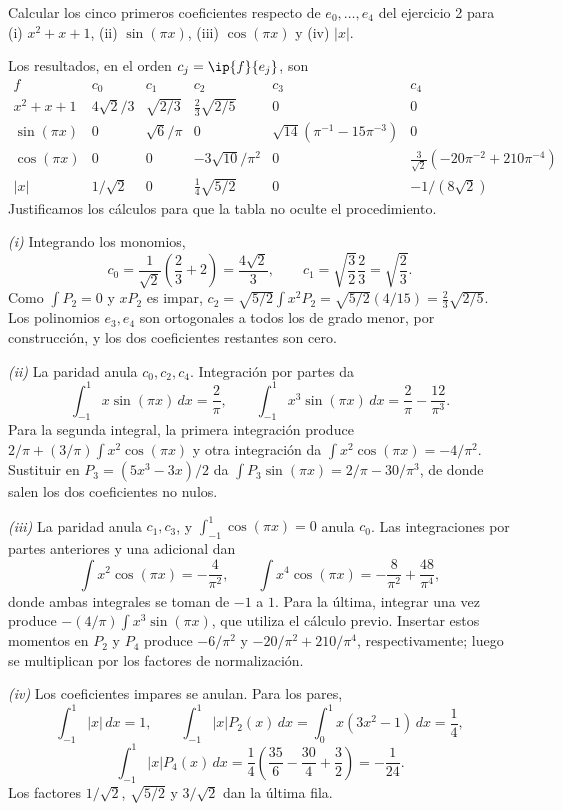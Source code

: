 \begin{ejercicio}
Calcular los cinco primeros coeficientes respecto de $e_0,\dots,e_4$ del ejercicio 2 para (i) $x^2+x+1$, (ii) $\sin(\pi x)$, (iii) $\cos(\pi x)$ y (iv) $|x|$.
\end{ejercicio}
\begin{solucion}
Los resultados, en el orden $c_j=\ip{f}{e_j}$, son
\[
\begin{array}{c|ccccc}
 f&c_0&c_1&c_2&c_3&c_4\\ \hline
 x^2+x+1&4\sqrt2/3&\sqrt{2/3}&\frac23\sqrt{2/5}&0&0\\[2pt]
 \sin(\pi x)&0&\sqrt6/\pi&0&\sqrt{14}(\pi^{-1}-15\pi^{-3})&0\\[2pt]
 \cos(\pi x)&0&0&-3\sqrt{10}/\pi^2&0&\frac3{\sqrt2}(-20\pi^{-2}+210\pi^{-4})\\[2pt]
 |x|&1/\sqrt2&0&\frac14\sqrt{5/2}&0&-1/(8\sqrt2)
\end{array}
\]
Justificamos los cálculos para que la tabla no oculte el procedimiento.

\emph{(i)} Integrando los monomios,
\[
 c_0=\frac1{\sqrt2}\left(\frac23+2\right)=\frac{4\sqrt2}3,
 \qquad c_1=\sqrt{\frac32}\frac23=\sqrt{\frac23}.
\]
Como $\int P_2=0$ y $xP_2$ es impar,
$c_2=\sqrt{5/2}\int x^2P_2=\sqrt{5/2}(4/15)=\frac23\sqrt{2/5}$.
Los polinomios $e_3,e_4$ son ortogonales a todos los de grado menor, por construcción, y los dos coeficientes restantes son cero.

\emph{(ii)} La paridad anula $c_0,c_2,c_4$. Integración por partes da
\[
 \int_{-1}^{1}x\sin(\pi x)\,dx=\frac2\pi,
 \qquad
 \int_{-1}^{1}x^3\sin(\pi x)\,dx=\frac2\pi-\frac{12}{\pi^3}.
\]
Para la segunda integral, la primera integración produce $2/\pi+(3/\pi)\int x^2\cos(\pi x)$ y otra integración da $\int x^2\cos(\pi x)=-4/\pi^2$. Sustituir en $P_3=(5x^3-3x)/2$ da $\int P_3\sin(\pi x)=2/\pi-30/\pi^3$, de donde salen los dos coeficientes no nulos.

\emph{(iii)} La paridad anula $c_1,c_3$, y $\int_{-1}^{1}\cos(\pi x)=0$ anula $c_0$. Las integraciones por partes anteriores y una adicional dan
\[
 \int x^2\cos(\pi x)=-\frac4{\pi^2},\qquad
 \int x^4\cos(\pi x)=-\frac8{\pi^2}+\frac{48}{\pi^4},
\]
donde ambas integrales se toman de $-1$ a $1$. Para la última, integrar una vez produce $-(4/\pi)\int x^3\sin(\pi x)$, que utiliza el cálculo previo. Insertar estos momentos en $P_2$ y $P_4$ produce $-6/\pi^2$ y $-20/\pi^2+210/\pi^4$, respectivamente; luego se multiplican por los factores de normalización.

\emph{(iv)} Los coeficientes impares se anulan. Para los pares,
\[
 \int_{-1}^{1}|x|\,dx=1,\qquad
 \int_{-1}^{1}|x|P_2(x)\,dx=\int_0^1x(3x^2-1)\,dx=\frac14,
\]
\[
 \int_{-1}^{1}|x|P_4(x)\,dx
 =\frac14\left(\frac{35}{6}-\frac{30}{4}+\frac32\right)=-\frac1{24}.
\]
Los factores $1/\sqrt2$, $\sqrt{5/2}$ y $3/\sqrt2$ dan la última fila.
\end{solucion}

